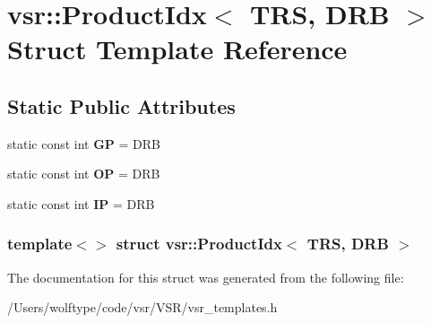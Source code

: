 \hypertarget{structvsr_1_1_product_idx_3_01_t_r_s_00_01_d_r_b_01_4}{\section{vsr\-:\-:Product\-Idx$<$ T\-R\-S, D\-R\-B $>$ Struct Template Reference}
\label{structvsr_1_1_product_idx_3_01_t_r_s_00_01_d_r_b_01_4}
}
\subsection*{Static Public Attributes}
\begin{DoxyCompactItemize}
\item 
\hypertarget{structvsr_1_1_product_idx_3_01_t_r_s_00_01_d_r_b_01_4_ae1a3d766de0a982929c92484306dc0fb}{static const int {\bfseries G\-P} = D\-R\-B}\label{structvsr_1_1_product_idx_3_01_t_r_s_00_01_d_r_b_01_4_ae1a3d766de0a982929c92484306dc0fb}

\item 
\hypertarget{structvsr_1_1_product_idx_3_01_t_r_s_00_01_d_r_b_01_4_a558f496ecab218365d663118fe4ce24b}{static const int {\bfseries O\-P} = D\-R\-B}\label{structvsr_1_1_product_idx_3_01_t_r_s_00_01_d_r_b_01_4_a558f496ecab218365d663118fe4ce24b}

\item 
\hypertarget{structvsr_1_1_product_idx_3_01_t_r_s_00_01_d_r_b_01_4_a5b45be6bbf292f9c0de36e65968c7961}{static const int {\bfseries I\-P} = D\-R\-B}\label{structvsr_1_1_product_idx_3_01_t_r_s_00_01_d_r_b_01_4_a5b45be6bbf292f9c0de36e65968c7961}

\end{DoxyCompactItemize}
\subsubsection*{template$<$$>$ struct vsr\-::\-Product\-Idx$<$ T\-R\-S, D\-R\-B $>$}



The documentation for this struct was generated from the following file\-:\begin{DoxyCompactItemize}
\item 
/\-Users/wolftype/code/vsr/\-V\-S\-R/vsr\-\_\-templates.\-h\end{DoxyCompactItemize}
